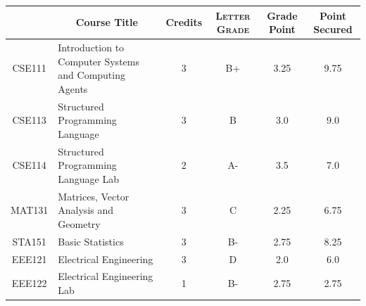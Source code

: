 \documentclass[11pt]{article}
\newcommand*{\numtwo}[1]{\pgfmathprintnumber[
                    fixed, precision=2, fixed zerofill=true]{#1}}
\begin{document}
                \begin{center}
                    \renewcommand{\arraystretch}{1.08}
                    
                \begin{tabular}{|c|l|c|>{\scshape}c|c|c|}
                \hline  \rule[-1ex]{0pt}{3.5ex} {\centering{\bf Course Code}} &  \multicolumn{1}{c|}{\textbf{Course Title}}  & {\bf Credits} & {\bf Letter Grade} & {\bf Grade Point} & {\bf Point Secured}  \\ 
                \hline   CSE111 &  Introduction to Computer Systems and Computing Agents		 & 3 & B+ & 3.25 & 9.75 \\ %
                \hline   CSE113 &  Structured Programming Language		 & 3 & B & 3.0 & 9.0 \\ %
                \hline   CSE114 &  Structured Programming Language Lab		 & 2 & A- & 3.5 & 7.0 \\ %
                \hline   MAT131 &  Matrices, Vector Analysis and Geometry		 & 3 & C & 2.25 & 6.75 \\ %
                \hline   STA151 &  Basic Statistics		 & 3 & B- & 2.75 & 8.25 \\ %
                \hline   EEE121 &  Electrical Engineering		 & 3 & D & 2.0 & 6.0 \\ %
                \hline   EEE122 &  Electrical Engineering Lab		 & 1 & B- & 2.75 & 2.75 \\ %

\hline                %
                \end{tabular}
                \end{center}
                \renewcommand{\arraystretch}{1.03}
\end{document}
